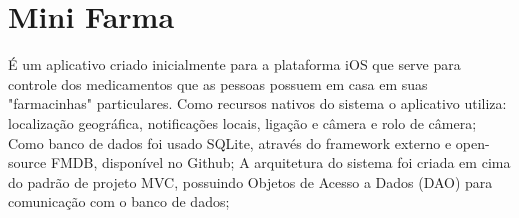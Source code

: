 \section{Mini Farma}

É um aplicativo criado inicialmente para a plataforma iOS que serve para controle dos medicamentos que as 
pessoas possuem em casa em suas "farmacinhas" particulares.
Como recursos nativos do sistema o aplicativo utiliza: localização geográfica, notificações locais, ligação e 
câmera e rolo de câmera;
Como banco de dados foi usado SQLite, através do framework externo e open-source FMDB, disponível no Github;
A arquitetura do sistema foi criada em cima do padrão de projeto MVC, 
possuindo Objetos de Acesso a Dados (DAO) para comunicação com o banco de dados;


